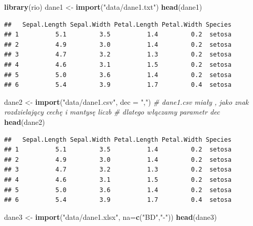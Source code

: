 \documentclass[]{book}
\newenvironment{Shaded}{\begin{snugshade}}{\end{snugshade}}
\newcommand{\CommentTok}[1]{\textcolor[rgb]{0.56,0.35,0.01}{\textit{#1}}}
\newcommand{\DataTypeTok}[1]{\textcolor[rgb]{0.13,0.29,0.53}{#1}}
\newcommand{\KeywordTok}[1]{\textcolor[rgb]{0.13,0.29,0.53}{\textbf{#1}}}
\newcommand{\NormalTok}[1]{#1}
\newcommand{\StringTok}[1]{\textcolor[rgb]{0.31,0.60,0.02}{#1}}
\theoremstyle{plain}
\theoremstyle{definition}
\begin{document}
\begin{Shaded}
\begin{Highlighting}[]
\KeywordTok{library}\NormalTok{(rio)}
\NormalTok{dane1 <-}\StringTok{ }\KeywordTok{import}\NormalTok{(}\StringTok{"data/dane1.txt"}\NormalTok{)}
\KeywordTok{head}\NormalTok{(dane1)}
\end{Highlighting}
\end{Shaded}

\begin{verbatim}
##   Sepal.Length Sepal.Width Petal.Length Petal.Width Species
## 1          5.1         3.5          1.4         0.2  setosa
## 2          4.9         3.0          1.4         0.2  setosa
## 3          4.7         3.2          1.3         0.2  setosa
## 4          4.6         3.1          1.5         0.2  setosa
## 5          5.0         3.6          1.4         0.2  setosa
## 6          5.4         3.9          1.7         0.4  setosa
\end{verbatim}

\begin{Shaded}
\begin{Highlighting}[]
\NormalTok{dane2 <-}\StringTok{ }\KeywordTok{import}\NormalTok{(}\StringTok{"data/dane1.csv"}\NormalTok{, }\DataTypeTok{dec =} \StringTok{","}\NormalTok{)}
\CommentTok{# dane1.csv miały , jako znak rozdzielający cechę i mantysę liczb}
\CommentTok{# dlatego włączamy parametr dec}
\KeywordTok{head}\NormalTok{(dane2)}
\end{Highlighting}
\end{Shaded}

\begin{verbatim}
##   Sepal.Length Sepal.Width Petal.Length Petal.Width Species
## 1          5.1         3.5          1.4         0.2  setosa
## 2          4.9         3.0          1.4         0.2  setosa
## 3          4.7         3.2          1.3         0.2  setosa
## 4          4.6         3.1          1.5         0.2  setosa
## 5          5.0         3.6          1.4         0.2  setosa
## 6          5.4         3.9          1.7         0.4  setosa
\end{verbatim}

\begin{Shaded}
\begin{Highlighting}[]
\NormalTok{dane3 <-}\StringTok{ }\KeywordTok{import}\NormalTok{(}\StringTok{"data/dane1.xlsx"}\NormalTok{, }\DataTypeTok{na=}\KeywordTok{c}\NormalTok{(}\StringTok{"BD"}\NormalTok{,}\StringTok{"-"}\NormalTok{))}
\KeywordTok{head}\NormalTok{(dane3)}
\end{Highlighting}
\end{Shaded}
\end{document}
